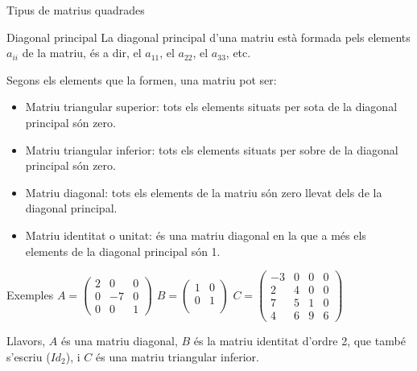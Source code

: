 \documentclass{beamer}
\begin{document}
\begin{frame}{Tipus de matrius quadrades}
\begin{block}{Diagonal principal}
La diagonal principal d'una matriu està formada pels elements $a_{ii}$ de la matriu, és a dir, el $a_{11}$, el $a_{22}$, el $a_{33}$, etc.
\end{block}
Segons els elements que la formen, una matriu pot ser:
\begin{itemize}
\item
Matriu triangular superior: tots els elements situats per sota de la diagonal principal són zero.
\item
Matriu triangular inferior: tots els elements situats per sobre de la diagonal principal són zero.
\item
Matriu diagonal: tots els elements de la matriu són zero llevat dels de la diagonal principal.
\item
Matriu identitat o unitat: és una matriu diagonal en la que a més els elements de la diagonal principal són 1.
\end{itemize}
\end{frame}
\begin{frame}
\begin{exampleblock}{Exemples}
$A=\left(\begin{array}{ccc}
2 & 0 & 0\\
0 & -7 & 0\\
0 & 0 & 1\end{array}\right)$
$B=\left(\begin{array}{cc}
1 & 0\\
0 & 1\\
\end{array}\right)$
$C=\left(\begin{array}{cccc}
-3 & 0 & 0 & 0\\
2 & 4 & 0 & 0\\
7 & 5 & 1 & 0\\
4 & 6 & 9 & 6\end{array}\right)$

\bigskip
Llavors, $A$ és una matriu diagonal, $B$ és la matriu identitat d'ordre 2, que també s'escriu ($Id_{2}$), i $C$ és una matriu triangular inferior.
\end{exampleblock}
\end{frame}
\end{document}
